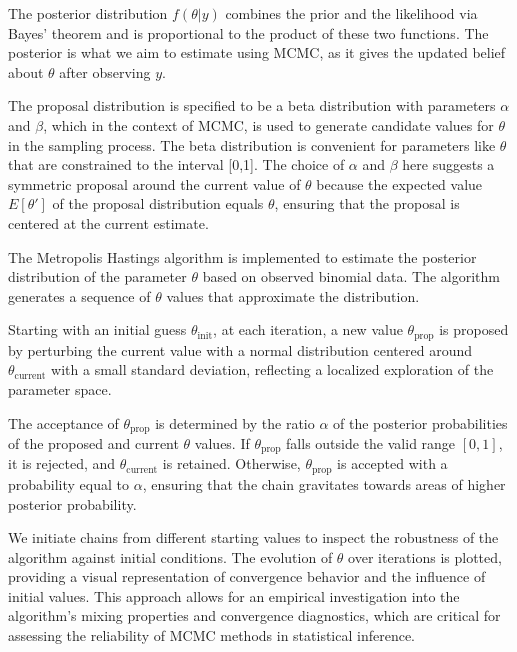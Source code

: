 The posterior distribution \( f(\theta | y) \) combines the prior and the likelihood via Bayes' theorem and is proportional to the product of these two functions. The posterior is what we aim to estimate using MCMC, as it gives the updated belief about \( \theta \) after observing \( y \).

The proposal distribution is specified to be a beta distribution with parameters \( \alpha \) and \( \beta \), which in the context of MCMC, is used to generate candidate values for \( \theta \) in the sampling process. The beta distribution is convenient for parameters like \( \theta \) that are constrained to the interval [0,1]. The choice of \( \alpha \) and \( \beta \) here suggests a symmetric proposal around the current value of \( \theta \) because the expected value \( E[\theta'] \) of the proposal distribution equals \( \theta \), ensuring that the proposal is centered at the current estimate.

% 
The Metropolis Hastings algorithm is implemented to estimate the posterior distribution of the parameter \( \theta \) based on observed binomial data. The algorithm generates a sequence of \( \theta \) values that approximate the distribution.

Starting with an initial guess \( \theta_{\text{init}} \), at each iteration, a new value \( \theta_{\text{prop}} \) is proposed by perturbing the current value with a normal distribution centered around \( \theta_{\text{current}} \) with a small standard deviation, reflecting a localized exploration of the parameter space.

The acceptance of \( \theta_{\text{prop}} \) is determined by the ratio \( \alpha \) of the posterior probabilities of the proposed and current \( \theta \) values. If \( \theta_{\text{prop}} \) falls outside the valid range \([0, 1]\), it is rejected, and \( \theta_{\text{current}} \) is retained. Otherwise, \( \theta_{\text{prop}} \) is accepted with a probability equal to \( \alpha \), ensuring that the chain gravitates towards areas of higher posterior probability.

We initiate chains from different starting values to inspect the robustness of the algorithm against initial conditions. The evolution of \( \theta \) over iterations is plotted, providing a visual representation of convergence behavior and the influence of initial values. This approach allows for an empirical investigation into the algorithm's mixing properties and convergence diagnostics, which are critical for assessing the reliability of MCMC methods in statistical inference.

